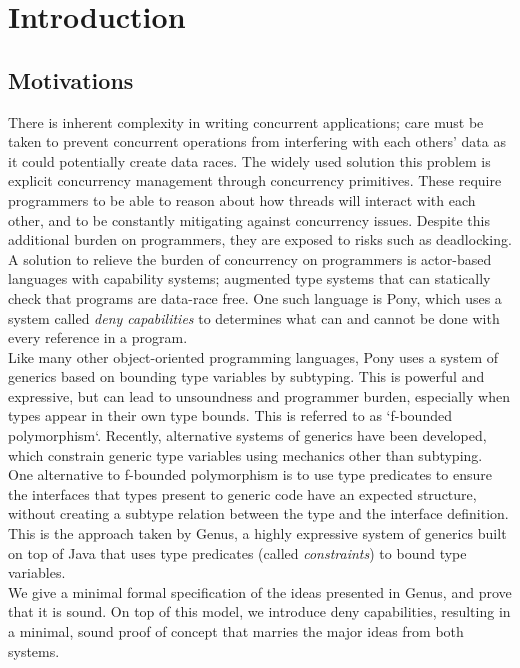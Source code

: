 \chapter{Introduction}

\section{Motivations}

There is inherent complexity in writing concurrent applications; care must be taken to prevent concurrent operations from interfering with each others' data as it could potentially create data races. The widely used solution this problem is explicit concurrency management through concurrency primitives. These require programmers to be able to reason about how threads will interact with each other, and to be constantly mitigating against concurrency issues. Despite this additional burden on programmers, they are exposed to risks such as deadlocking. \\

A solution to relieve the burden of concurrency on programmers is actor-based languages with capability systems; augmented type systems that can statically check that programs are data-race free. One such language is Pony, which uses a system called \textit{deny capabilities} to determines what can and cannot be done with every reference in a program. \\

Like many other object-oriented programming languages, Pony uses a system of generics based on bounding type variables by subtyping. This is powerful and expressive, but can lead to unsoundness and programmer burden, especially when types appear in their own type bounds. This is referred to as `f-bounded polymorphism`. Recently, alternative systems of generics have been developed, which constrain generic type variables using mechanics other than subtyping. \\

One alternative to f-bounded polymorphism is to use type predicates to ensure the interfaces that types present to generic code have an expected structure, without creating a subtype relation between the type and the interface definition. This is the approach taken by Genus\cite{Zhang2015}, a highly expressive system of generics built on top of Java that uses type predicates (called \textit{constraints}) to bound type variables. \\

We give a minimal formal specification of the ideas presented in Genus, and prove that it is sound. On top of this model, we introduce deny capabilities, resulting in a minimal, sound proof of concept that marries the major ideas from both systems.

